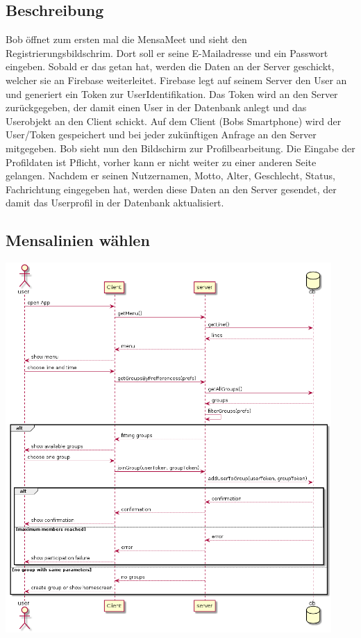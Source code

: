 \documentclass[a4paper]{scrreprt}
\begin{document}
\subsection*{Beschreibung}
Bob öffnet zum ersten mal die  MensaMeet und sieht den Registrierungsbildschrim. Dort soll er seine E-Mailadresse und ein Passwort eingeben. Sobald er das getan hat, werden die Daten an der Server geschickt, welcher sie an Firebase weiterleitet. Firebase legt auf seinem Server den User an und generiert ein Token zur UserIdentifikation. Das Token wird an den Server zurückgegeben, der damit einen User in der Datenbank anlegt und das Userobjekt an den Client schickt. Auf dem Client (Bobs Smartphone) wird der User/Token gespeichert und bei jeder zukünftigen Anfrage an den Server mitgegeben. 
Bob sieht nun den Bildschirm zur Profilbearbeitung. Die Eingabe der Profildaten ist Pflicht, vorher kann er nicht weiter zu einer anderen Seite gelangen.
Nachdem er seinen Nutzernamen, Motto, Alter, Geschlecht, Status, Fachrichtung eingegeben hat, werden diese Daten an den Server gesendet, der damit das Userprofil in der Datenbank aktualisiert. 
\newpage
\subsection{Mensalinien wählen}
\begin{center}
	\includegraphics[width=0.93\textwidth]{Sequenzdiagramme/chooseLineAndTimeSD.png}
\end{center}
\end{document}
